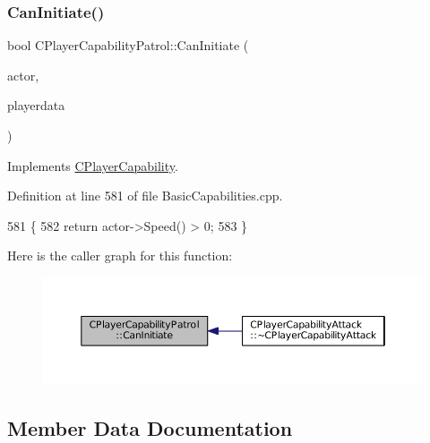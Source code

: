 \subsubsection{\texorpdfstring{Can\+Initiate()}{CanInitiate()}}
{\footnotesize\ttfamily bool C\+Player\+Capability\+Patrol\+::\+Can\+Initiate (\begin{DoxyParamCaption}\item[{std\+::shared\+\_\+ptr$<$ \hyperlink{classCPlayerAsset}{C\+Player\+Asset} $>$}]{actor,  }\item[{std\+::shared\+\_\+ptr$<$ \hyperlink{classCPlayerData}{C\+Player\+Data} $>$}]{playerdata }\end{DoxyParamCaption})\hspace{0.3cm}{\ttfamily [virtual]}}



Implements \hyperlink{classCPlayerCapability_aa83b1e1fcaff2985c378132d679154ea}{C\+Player\+Capability}.



Definition at line 581 of file Basic\+Capabilities.\+cpp.


\begin{DoxyCode}
581                                                                                                            
                \{
582     \textcolor{keywordflow}{return} actor->Speed() > 0;
583 \}
\end{DoxyCode}
Here is the caller graph for this function\+:
\nopagebreak
\begin{figure}[H]
\begin{center}
\leavevmode
\includegraphics[width=350pt]{classCPlayerCapabilityPatrol_a48e60ecd544759f3aad66afeb4a6e0a9_icgraph}
\end{center}
\end{figure}


\subsection{Member Data Documentation}
\hypertarget{classCPlayerCapabilityPatrol_af3e88478d9266aa4c7f2f0457da84e89}{}\label{classCPlayerCapabilityPatrol_af3e88478d9266aa4c7f2f0457da84e89} 

